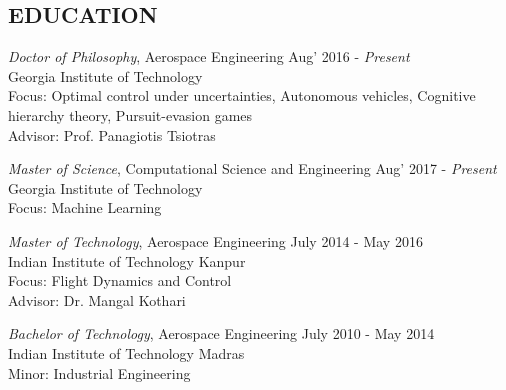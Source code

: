 \documentclass[margin, 10pt]{res} %
\begin{document}
\begin{resume}

 



\section{EDUCATION}

{\sl Doctor of Philosophy}, Aerospace Engineering \hfill Aug' 2016 - \emph{Present} \\
Georgia Institute of Technology \\
Focus: Optimal control under uncertainties, Autonomous vehicles, Cognitive hierarchy theory, Pursuit-evasion games\\
Advisor: Prof. Panagiotis Tsiotras

{\sl Master of Science}, Computational Science and Engineering \hfill Aug' 2017 - \emph{Present} \\
Georgia Institute of Technology \\
Focus: Machine Learning

{\sl Master of Technology}, Aerospace Engineering \hfill July 2014 - May 2016 \\
Indian Institute of Technology Kanpur \\
Focus: Flight Dynamics and Control\\
Advisor: Dr. Mangal Kothari

{\sl Bachelor of Technology}, Aerospace Engineering  \hfill July 2010 - May 2014 \\
Indian Institute of Technology Madras \\
Minor: Industrial Engineering
 
 

\end{resume}
\end{document}
